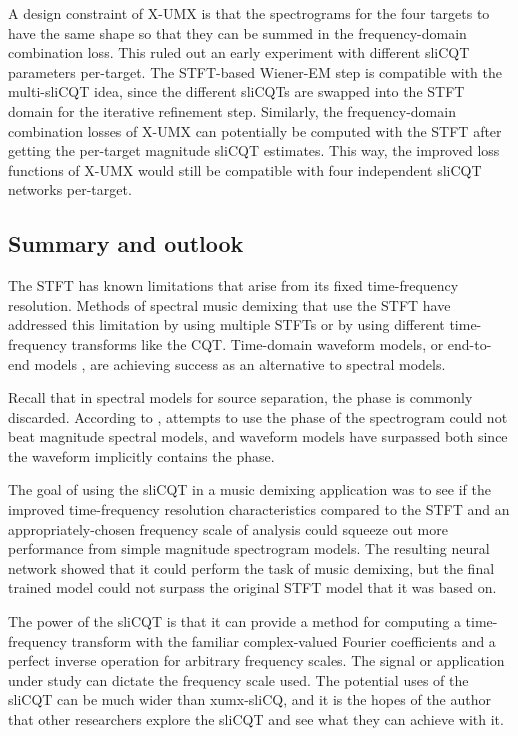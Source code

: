 \documentclass[report.tex]{subfiles}
\begin{document}
A design constraint of X-UMX is that the spectrograms for the four targets to have the same shape so that they can be summed in the frequency-domain combination loss. This ruled out an early experiment with different sliCQT parameters per-target. The STFT-based Wiener-EM step is compatible with the multi-sliCQT idea, since the different sliCQTs are swapped into the STFT domain for the iterative refinement step. Similarly, the frequency-domain combination losses of X-UMX can potentially be computed with the STFT after getting the per-target magnitude sliCQT estimates. This way, the improved loss functions of X-UMX would still be compatible with four independent sliCQT networks per-target.

\subsection{Summary and outlook}

The STFT has known limitations that arise from its fixed time-frequency resolution. Methods of spectral music demixing that use the STFT have addressed this limitation by using multiple STFTs or by using different time-frequency transforms like the CQT. Time-domain waveform models, or end-to-end models \parencite{waveunet, demucs, endtoend}, are achieving success as an alternative to spectral models.

Recall that in spectral models for source separation, the phase is commonly discarded. According to \textcite{endtoend}, attempts to use the phase of the spectrogram could not beat magnitude spectral models, and waveform models have surpassed both since the waveform implicitly contains the phase.

The goal of using the sliCQT in a music demixing application was to see if the improved time-frequency resolution characteristics compared to the STFT and an appropriately-chosen frequency scale of analysis could squeeze out more performance from simple magnitude spectrogram models. The resulting neural network showed that it could perform the task of music demixing, but the final trained model could not surpass the original STFT model that it was based on.

The power of the sliCQT is that it can provide a method for computing a time-frequency transform with the familiar complex-valued Fourier coefficients and a perfect inverse operation for arbitrary frequency scales. The signal or application under study can dictate the frequency scale used. The potential uses of the sliCQT can be much wider than xumx-sliCQ, and it is the hopes of the author that other researchers explore the sliCQT and see what they can achieve with it.
\end{document}
